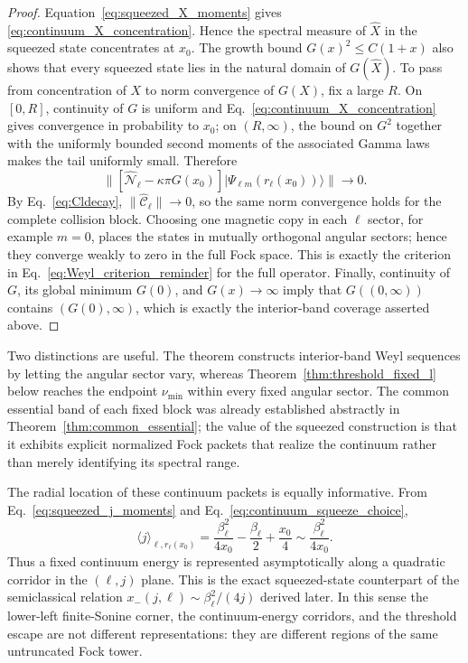 \documentclass[11pt]{article}
\numberwithin{equation}{section}
\theoremstyle{definition}
\begin{document}
\begin{proof}
Equation~\eqref{eq:squeezed_X_moments} gives
\eqref{eq:continuum_X_concentration}.  Hence the spectral measure of
$\widehat X$ in the squeezed state concentrates at $x_0$.  The growth bound
$G(x)^2\le C(1+x)$ also shows that every squeezed state lies in the natural
domain of $G(\widehat X)$.  To pass from concentration of $X$ to norm
convergence of $G(X)$, fix a large $R$.  On $[0,R]$, continuity of $G$ is
uniform and Eq.~\eqref{eq:continuum_X_concentration} gives convergence in
probability to $x_0$; on $(R,\infty)$, the bound on $G^2$ together with the
uniformly bounded second moments of the associated Gamma laws makes the tail
uniformly small.  Therefore
\begin{equation}
 \|[\widehat{\mathcal N}_\ell-\kappa\pi G(x_0)]
 |\Psi_{\ell m}(r_\ell(x_0))\rangle\|
 \longrightarrow0.
 \label{eq:continuum_loss_Weyl}
\end{equation}
By Eq.~\eqref{eq:Cldecay},
$\|\widehat{\mathcal C}_\ell\|\to0$, so the same norm convergence holds for
the complete collision block.  Choosing one magnetic copy in each $\ell$
sector, for example $m=0$, places the states in mutually orthogonal angular
sectors; hence they converge weakly to zero in the full Fock space.  This is exactly the criterion in
Eq.~\eqref{eq:Weyl_criterion_reminder} for the full operator.  Finally, continuity of $G$, its global minimum $G(0)$, and $G(x)\to\infty$ imply that
$G((0,\infty))$ contains $(G(0),\infty)$, which is exactly the interior-band
coverage asserted above.
\end{proof}

Two distinctions are useful.  The theorem constructs interior-band Weyl
sequences by letting the angular sector vary, whereas
Theorem~\ref{thm:threshold_fixed_l} below reaches the endpoint
$\nu_{\min}$ within every fixed angular sector.  The common essential band of
each fixed block was already established abstractly in
Theorem~\ref{thm:common_essential}; the value of the squeezed construction is
that it exhibits explicit normalized Fock packets that realize the continuum
rather than merely identifying its spectral range.

The radial location of these continuum packets is equally informative.  From
Eq.~\eqref{eq:squeezed_j_moments} and
Eq.~\eqref{eq:continuum_squeeze_choice},
\begin{equation}
 \boxed{
 \langle j\rangle_{\ell,r_\ell(x_0)}
 =\frac{\beta_\ell^2}{4x_0}
 -\frac{\beta_\ell}{2}
 +\frac{x_0}{4}
 \sim\frac{\beta_\ell^2}{4x_0}.
 }
 \label{eq:continuum_j_corridor}
\end{equation}
Thus a fixed continuum energy is represented asymptotically along a quadratic
corridor in the $(\ell,j)$ plane.  This is the exact squeezed-state
counterpart of the semiclassical relation
$x_-(j,\ell)\sim\beta_\ell^2/(4j)$ derived later.  In this sense the
lower-left finite-Sonine corner, the continuum-energy corridors, and the
threshold escape are not different representations: they are different
regions of the same untruncated Fock tower.
\end{document}
